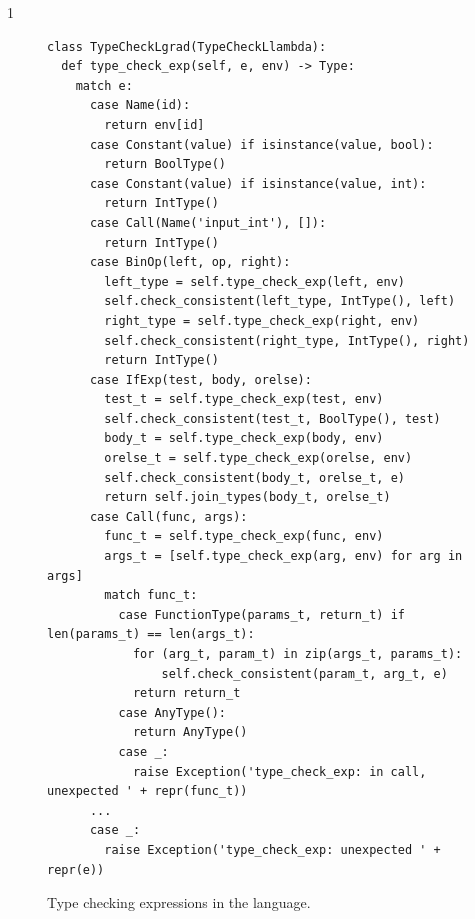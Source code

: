 \documentclass[7x10]{TimesAPriori_MIT}%
\def\pythonEd{1}
\def\edition{1}
\newcommand{\pythonColor}[0]{}
\numberwithin{theorem}{chapter}
\numberwithin{definition}{chapter}
\numberwithin{equation}{chapter}
\begin{document}
{\if\edition\pythonEd\pythonColor        
\begin{figure}[tbp]
\begin{tcolorbox}[colback=white]  
\begin{lstlisting}[basicstyle=\ttfamily\footnotesize]
class TypeCheckLgrad(TypeCheckLlambda):
  def type_check_exp(self, e, env) -> Type:
    match e:
      case Name(id):
        return env[id]
      case Constant(value) if isinstance(value, bool):
        return BoolType()
      case Constant(value) if isinstance(value, int):
        return IntType()
      case Call(Name('input_int'), []):
        return IntType()
      case BinOp(left, op, right):
        left_type = self.type_check_exp(left, env)
        self.check_consistent(left_type, IntType(), left)
        right_type = self.type_check_exp(right, env)
        self.check_consistent(right_type, IntType(), right)
        return IntType()
      case IfExp(test, body, orelse):
        test_t = self.type_check_exp(test, env)
        self.check_consistent(test_t, BoolType(), test)
        body_t = self.type_check_exp(body, env)
        orelse_t = self.type_check_exp(orelse, env)
        self.check_consistent(body_t, orelse_t, e)
        return self.join_types(body_t, orelse_t)
      case Call(func, args):
        func_t = self.type_check_exp(func, env)
        args_t = [self.type_check_exp(arg, env) for arg in args]
        match func_t:
          case FunctionType(params_t, return_t) if len(params_t) == len(args_t):
            for (arg_t, param_t) in zip(args_t, params_t):
                self.check_consistent(param_t, arg_t, e)
            return return_t
          case AnyType():
            return AnyType()
          case _:
            raise Exception('type_check_exp: in call, unexpected ' + repr(func_t))
      ...
      case _:
        raise Exception('type_check_exp: unexpected ' + repr(e))
\end{lstlisting}
\end{tcolorbox}

\caption{Type checking expressions in the \LangGrad{} language.}
\label{fig:type-check-Lgradual-1}
\end{figure}

}
\end{document}
